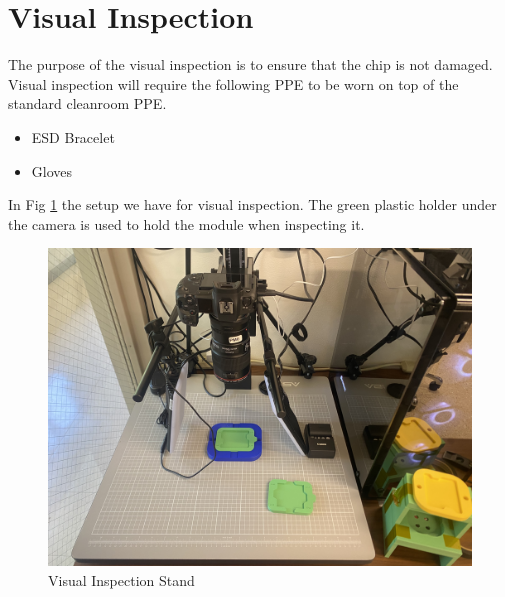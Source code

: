 \documentclass[12pt]{article}
\begin{document}
\newpage
\section{Visual Inspection}
\label{sec:vis-inspect}

The purpose of the visual inspection is to ensure that the chip is not damaged.
Visual inspection will require the following PPE to be worn on top of the standard cleanroom PPE. 
\begin{itemize}
    \item ESD Bracelet
    \item Gloves
\end{itemize}


In Fig \ref{fig:visinspect} the setup we have for visual inspection. The green plastic holder under the camera is used to hold the module when inspecting it.
\begin{figure}[H]
    \centering
    \includegraphics[width=0.5\linewidth]{Figures/visinspect.jpg}
    \caption{Visual Inspection Stand}
    \label{fig:visinspect}
\end{figure}
\end{document}
